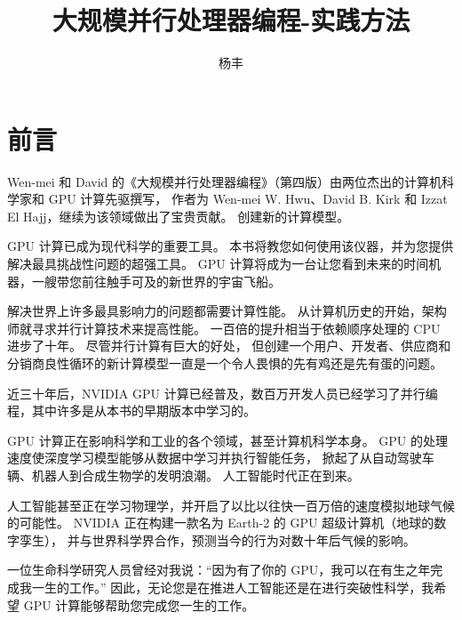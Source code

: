 \documentclass{ctexart}
\numberwithin{equation}{section}
\begin{document}
\title{大规模并行处理器编程-实践方法}

\author{杨丰}
\date{}
\maketitle
\section*{前言}
Wen-mei 和 David 的《大规模并行处理器编程》（第四版）由两位杰出的计算机科学家和 GPU 计算先驱撰写，
作者为 Wen-mei W. Hwu、David B. Kirk 和 Izzat El Hajj，继续为该领域做出了宝贵贡献。 创建新的计算模型。

GPU 计算已成为现代科学的重要工具。 本书将教您如何使用该仪器，并为您提供解决最具挑战性问题的超强工具。 
GPU 计算将成为一台让您看到未来的时间机器，一艘带您前往触手可及的新世界的宇宙飞船。

解决世界上许多最具影响力的问题都需要计算性能。 从计算机历史的开始，架构师就寻求并行计算技术来提高性能。 
一百倍的提升相当于依赖顺序处理的 CPU 进步了十年。 尽管并行计算有巨大的好处，
但创建一个用户、开发者、供应商和分销商良性循环的新计算模型一直是一个令人畏惧的先有鸡还是先有蛋的问题。

近三十年后，NVIDIA GPU 计算已经普及，数百万开发人员已经学习了并行编程，其中许多是从本书的早期版本中学习的。

GPU 计算正在影响科学和工业的各个领域，甚至计算机科学本身。 GPU 的处理速度使深度学习模型能够从数据中学习并执行智能任务，
掀起了从自动驾驶车辆、机器人到合成生物学的发明浪潮。 人工智能时代正在到来。

人工智能甚至正在学习物理学，并开启了以比以往快一百万倍的速度模拟地球气候的可能性。 
NVIDIA 正在构建一款名为 Earth-2 的 GPU 超级计算机（地球的数字孪生），
并与世界科学界合作，预测当今的行为对数十年后气候的影响。

一位生命科学研究人员曾经对我说：“因为有了你的 GPU，我可以在有生之年完成我一生的工作。” 
因此，无论您是在推进人工智能还是在进行突破性科学，我希望 GPU 计算能够帮助您完成您一生的工作。

\newpage
\tableofcontents
\end{document}
